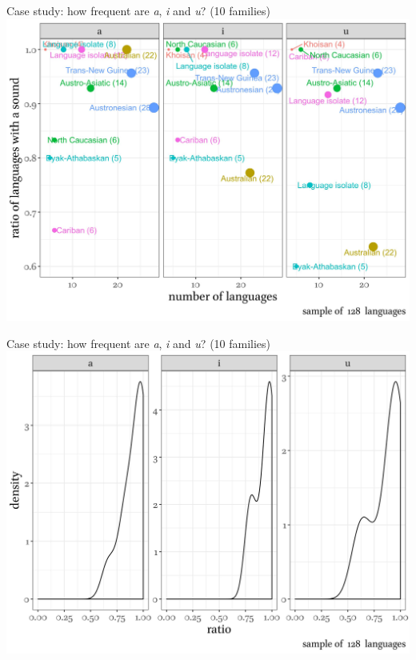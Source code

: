 \documentclass[13pt, t]{beamer}
\begin{document}
\begin{frame}{Case study: how frequent are \textit{a}, \textit{i} and \textit{u}? (10 families)}
\includegraphics[width = \linewidth]{images/06_families_sample}
\end{frame}

\begin{frame}{Case study: how frequent are \textit{a}, \textit{i} and \textit{u}? (10 families)}
\includegraphics[width = \linewidth]{images/07_distributions}
\end{frame}
\end{document}

